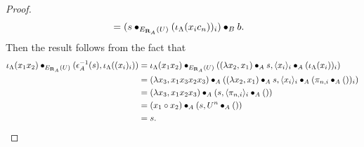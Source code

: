 \begin{proof}
\begin{align*}
    &= (s \bullet_{E_{\mathbf{R}_A}(U)} (\iota_\Lambda(x_i c_n))_i) \bullet_B b.
  \end{align*}
  Then the result follows from the fact that
  \begin{align*}
    \iota_\Lambda(x_1 x_2) \bullet_{E_{\mathbf{R}_A}(U)} (\epsilon_A^{-1}(s), \iota_\Lambda((x_i)_i))
    &= \iota_\Lambda(x_1 x_2) \bullet_{E_{\mathbf{R}_A}(U)} ((\lambda x_2, x_1) \bullet_A s, \langle x_i \rangle_i \bullet_A (\iota_\Lambda(x_i))_i)\\
    &= (\lambda x_3, x_1 x_3 x_2 x_3) \bullet_A ((\lambda x_2, x_1) \bullet_A s, \langle x_i \rangle_i \bullet_A (\pi_{n, i} \bullet_A ())_i)\\
    &= (\lambda x_3, x_1 x_2 x_3) \bullet_A (s, \langle \pi_{n, i} \rangle_i \bullet_A ())\\
    &= (x_1 \circ x_2) \bullet_A (s, U^n \bullet_A ())\\
    &= s.
  \end{align*}
\end{proof}

